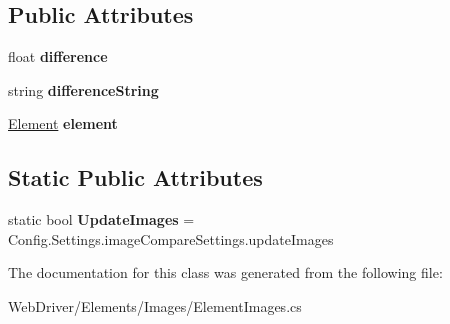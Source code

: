 \subsection*{Public Attributes}
\begin{DoxyCompactItemize}
\item 
\hypertarget{class_proto_test_1_1_golem_1_1_web_driver_1_1_elements_1_1_images_1_1_element_images_a9e34812ed4d138d4638a82e1bcd8d749}{float {\bfseries difference}}\label{class_proto_test_1_1_golem_1_1_web_driver_1_1_elements_1_1_images_1_1_element_images_a9e34812ed4d138d4638a82e1bcd8d749}

\item 
\hypertarget{class_proto_test_1_1_golem_1_1_web_driver_1_1_elements_1_1_images_1_1_element_images_a377e9165d0ab832c545f2d8c9eb1df13}{string {\bfseries difference\-String}}\label{class_proto_test_1_1_golem_1_1_web_driver_1_1_elements_1_1_images_1_1_element_images_a377e9165d0ab832c545f2d8c9eb1df13}

\item 
\hypertarget{class_proto_test_1_1_golem_1_1_web_driver_1_1_elements_1_1_images_1_1_element_images_acda3999df5da8dce5578e2bac414b1c5}{\hyperlink{class_proto_test_1_1_golem_1_1_web_driver_1_1_element}{Element} {\bfseries element}}\label{class_proto_test_1_1_golem_1_1_web_driver_1_1_elements_1_1_images_1_1_element_images_acda3999df5da8dce5578e2bac414b1c5}

\end{DoxyCompactItemize}
\subsection*{Static Public Attributes}
\begin{DoxyCompactItemize}
\item 
\hypertarget{class_proto_test_1_1_golem_1_1_web_driver_1_1_elements_1_1_images_1_1_element_images_a2bfd831daed27d30b1bf0a20fb57e88f}{static bool {\bfseries Update\-Images} = Config.\-Settings.\-image\-Compare\-Settings.\-update\-Images}\label{class_proto_test_1_1_golem_1_1_web_driver_1_1_elements_1_1_images_1_1_element_images_a2bfd831daed27d30b1bf0a20fb57e88f}

\end{DoxyCompactItemize}


The documentation for this class was generated from the following file\-:\begin{DoxyCompactItemize}
\item 
Web\-Driver/\-Elements/\-Images/Element\-Images.\-cs\end{DoxyCompactItemize}
